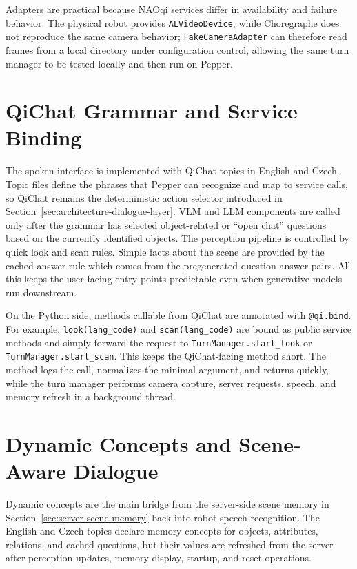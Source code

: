 Adapters are practical because NAOqi services differ in availability and failure behavior.
The physical robot provides \texttt{ALVideoDevice}, while Choregraphe does not reproduce the same camera behavior; \texttt{FakeCameraAdapter} can therefore read frames from a local directory under configuration control, allowing the same turn manager to be tested locally and then run on Pepper.

\section{QiChat Grammar and Service Binding}\label{sec:client-qichat}

The spoken interface is implemented with QiChat topics in English and Czech.
Topic files define the phrases that Pepper can recognize and map to service calls, so QiChat remains the deterministic action selector introduced in Section~\ref{sec:architecture-dialogue-layer}.
VLM and LLM components are called only after the grammar has selected object-related or \enquote{open chat} questions based on the currently identified objects. The perception pipeline is controlled by quick look and scan rules. Simple facts about the scene are provided by the cached answer rule which comes from the pregenerated question answer pairs. All this keeps the user-facing entry points predictable even when generative models run downstream.

On the Python side, methods callable from QiChat are annotated with \texttt{@qi.bind}.
For example, \texttt{look(lang\_code)} and \texttt{scan(lang\_code)} are bound as public service methods and simply forward the request to \texttt{TurnManager.start\_look} or \texttt{TurnManager.start\_scan}.
This keeps the QiChat-facing method short.
The method logs the call, normalizes the minimal argument, and returns quickly, while the turn manager performs camera capture, server requests, speech, and memory refresh in a background thread.

\section{Dynamic Concepts and Scene-Aware Dialogue}\label{sec:client-dynamic-concepts}

Dynamic concepts are the main bridge from the server-side scene memory in Section~\ref{sec:server-scene-memory} back into robot speech recognition.
The English and Czech topics declare memory concepts for objects, attributes, relations, and cached questions, but their values are refreshed from the server after perception updates, memory display, startup, and reset operations.

